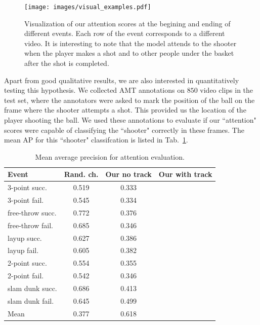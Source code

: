 \documentclass[10pt,twocolumn,letterpaper]{article}
\begin{document}
\begin{figure}[t!]
\begin{center}
   \texttt{[image: images/visual\_examples.pdf]}
\end{center}
   \caption{Visualization of our attention scores at the begining and ending of different events.
Each row of the event corresponds to a different video. It is interesting to note that the model
attends to the shooter when the player makes a shot and to other people under the basket after
the shot is completed.}
\label{fig:visual_attention}
\end{figure}


Apart from good qualitative results,
we are also interested in quantitatively testing this hypothesis.
We collected AMT annotations on $850$ video clips in the test
set, where the annotators were asked to mark the position of the ball
on the frame where the shooter attempts a shot.
This provided us the location of the player shooting the ball.
We used these annotations to evaluate if our ``attention" scores
were capable of classifying the ``shooter" correctly in these frames.
The mean AP for this ``shooter"  classifcation is listed
in Tab.~\ref{tab:attention_res}.

\begin{table}[ht!]
\begin{center}
\small
 \begin{tabular}{|l|c|c|c|}
  \hline
Event            & Rand. ch. & Our no track & Our with track \\ \hline \hline
3-point succ.    & 0.519 & 0.333 & \\ 
3-point fail.    & 0.545 & 0.334 & \\ 
free-throw succ. & 0.772 & 0.376 & \\ 
free-throw fail. & 0.685 & 0.346 & \\  
layup succ.      & 0.627 & 0.386 & \\ 
layup fail.      & 0.605 & 0.382 & \\ 
2-point succ.    & 0.554 & 0.355 & \\ 
2-point fail.    & 0.542 & 0.346 & \\ 
slam dunk succ.  & 0.686 & 0.413 & \\ 
slam dunk fail.  & 0.645 & 0.499 & \\ \hline \hline  
Mean             & 0.377 & 0.618 & \\ \hline
  \end{tabular}
\end{center}
  \caption{Mean average precision for attention evaluation.}
  \label{tab:attention_res}
\end{table}
\end{document}
